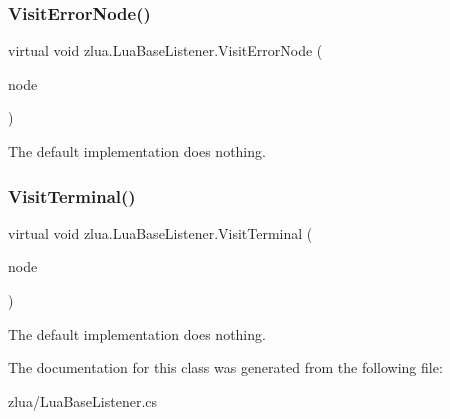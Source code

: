 \subsubsection{\texorpdfstring{Visit\+Error\+Node()}{VisitErrorNode()}}
{\footnotesize\ttfamily virtual void zlua.\+Lua\+Base\+Listener.\+Visit\+Error\+Node (\begin{DoxyParamCaption}\item[{\mbox{[}\+Not\+Null\mbox{]} I\+Error\+Node}]{node }\end{DoxyParamCaption})\hspace{0.3cm}{\ttfamily [virtual]}}

The default implementation does nothing.\mbox{\label{classzlua_1_1_lua_base_listener_a8cb7657e2ecbfc55be50ecb82ad121aa}} 
\subsubsection{\texorpdfstring{Visit\+Terminal()}{VisitTerminal()}}
{\footnotesize\ttfamily virtual void zlua.\+Lua\+Base\+Listener.\+Visit\+Terminal (\begin{DoxyParamCaption}\item[{\mbox{[}\+Not\+Null\mbox{]} I\+Terminal\+Node}]{node }\end{DoxyParamCaption})\hspace{0.3cm}{\ttfamily [virtual]}}

The default implementation does nothing.

The documentation for this class was generated from the following file\+:\begin{DoxyCompactItemize}
\item 
zlua/Lua\+Base\+Listener.\+cs\end{DoxyCompactItemize}
